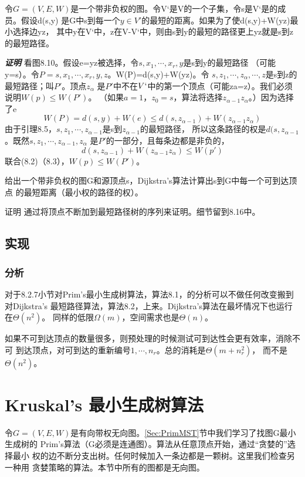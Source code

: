\begin{theorem}
令$G=(V, E, W)$是一个带非负权的图。令V`是V的一个子集，令s是V`是的成员。假设d(s,y)
是G中s到每一个$y\in V'$的最短的距离。如果为了使d(s,y)+W(yz)最小选择边yz，
其中y在V`中，z在V-V`中，则由s到y的最短的路径更上yz就是s到z的最短路径。

{\textbf{\emph{证明}}} 看图8.10。假设e=yz被选择，令$s, x_1, \cdots, x_r, y$是s到y的最短路径
（可能y=s）。令$P=s, x_1, \cdots, x_r, y, z$。W(P)=d(s,y)+W(yz)。令
$s, z_1, \cdots, z_\alpha, \cdots, z$是s到z的最短路径；叫$P'$。顶点$z_\alpha$
是$P'$中不在$V`$中的第一个顶点（可能za=z）。我们必须说明$W(p)\leq W(P')$。
（如果$a=1$，$z_0=s$，算法将选择$z_{\alpha-1}z_\alpha$。）因为选择了e
\begin{equation}
    W(P)=d(s,y)+W(e)\leq d(s,z_{\alpha-1})+W(z_{\alpha-1}z_\alpha)
\end{equation}
由于引理8.5，$s, z_1, \cdots, z_{\alpha-1}$是s到$z_{\alpha-1}$的最短路径，
所以这条路径的权是$d(s, z_{\alpha-1}$ 。既然$s, z_1, \cdots, z_{\alpha-1}, z_\alpha$
是$P'$的一部分，且每条边都是非负的，
\begin{equation}
d(s, z_{\alpha-1})+W(z_{\alpha-1}z_\alpha)\leq W(p')
\end{equation}
联合(8.2)（8.3），$W(p)\leq W(P')$。
\end{theorem}

\begin{theorem}
给出一个带非负权的图G和源顶点s，Dijkstra's算法计算出s到G中每一个可到达顶点
的最短距离（最小权的路径的权）。

证明 通过将顶点不断加到最短路径树的序列来证明。细节留到8.16中。
\end{theorem}

\subsection{实现}
\subsubsection{分析}
对于8.2.7小节对Prim's最小生成树算法，算法8.1，的分析可以不做任何改变搬到对Dijkstra's
最短路径算法，算法8.2，上来。Dijkstra's算法在最坏情况下也运行在$\Theta(n^2)$。
同样的低限$\Omega(m)$，空间需求也是$\Theta(n)$。

如果不可到达顶点的数量很多，则预处理的时候测试可到达性会更有效率，消除不可
到达顶点，对可到达的重新编号$1, \cdots, n_r$。总的消耗是$\Theta(m+n_r^2)$，
而不是$\Theta(n^2)$。


\section{Kruskal's 最小生成树算法}\label{Sec:KruskalMST}
令$G=(V, E, W)$是有向带权无向图。\ref{Sec:PrimMST}节中我们学习了找图G最小生成树的
Prim's算法（G必须是连通图）。算法从任意顶点开始，通过“贪婪的”选择最小
权的边不断分支出树。任何时候加入一条边都是一颗树。这里我们检查另一种用
贪婪策略的算法。本节中所有的图都是无向图。

